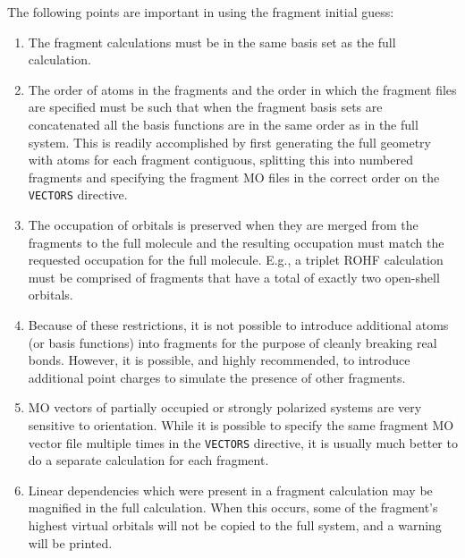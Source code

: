 The following points are important in using the fragment initial guess:
\begin{enumerate}
\item The fragment calculations must be in the same basis set as the
  full calculation.
\item The order of atoms in the fragments and the order in which the
  fragment files are specified must be such that when the fragment
  basis sets are concatenated all the basis functions are in the same
  order as in the full system.  This is readily accomplished by first
  generating the full geometry with atoms for each fragment
  contiguous, splitting this into numbered fragments and specifying
  the fragment MO files in the correct order on the \verb+VECTORS+
  directive.
\item The occupation of orbitals is preserved when they are merged
  from the fragments to the full molecule and the resulting occupation
  must match the requested occupation for the full molecule.  E.g., a
  triplet ROHF calculation must be comprised of fragments that have
  a total of exactly two open-shell orbitals. 
\item Because of these restrictions, it is not possible to introduce
  additional atoms (or basis functions) into fragments for the purpose
  of cleanly breaking real bonds.  However, it is possible, and highly
  recommended, to introduce additional point charges to simulate the
  presence of other fragments.
\item MO vectors of partially occupied or strongly polarized systems
  are very sensitive to orientation.  While it is possible to specify
  the same fragment MO vector file multiple times in the
  \verb+VECTORS+ directive, it is usually much better to do a separate
  calculation for each fragment.
\item Linear dependencies which were present in a fragment calculation
  may be magnified in the full calculation.  When this occurs, 
  some of the fragment's highest virtual orbitals will not be copied to the
  full system, and a warning will be printed.
  
\end{enumerate}

